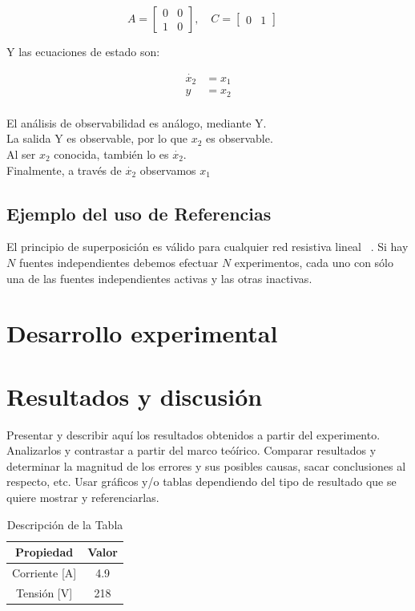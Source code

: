 \documentclass[letterpaper, 10 pt, conference]{ieeeconf}  %
\begin{document}
\[ 
A = \begin{bmatrix}
0 & 0\\
1 & 0
\end{bmatrix}, \quad
C = \begin{bmatrix}
0 & 1
\end{bmatrix} \quad 
\] 

Y las ecuaciones de estado son:

\[
\begin{aligned}
\dot{x_2} &=  x_1 \\
y&= x_2 \\
\end{aligned}
\]

El análisis de observabilidad es análogo, mediante Y. \\
La salida Y es observable, por lo que $x_2$ es observable. \\
Al ser $x_2$ conocida, también lo es $\dot{x_2}$. \\
Finalmente, a través de $\dot{x_2}$  observamos $x_1$ \\
\subsection{Ejemplo del uso de Referencias}

El principio de superposici\'on es v\'alido para cualquier red resistiva lineal ~\cite{c7}. Si hay $N$ fuentes independientes debemos efectuar $N$ experimentos, cada uno con s\'olo una de las fuentes independientes activas y las otras inactivas.

\section{Desarrollo experimental}



\section{Resultados y discusi\'on}

Presentar y describir aqu\'i los resultados obtenidos a partir del experimento. Analizarlos y contrastar a partir del marco te\'oírico. Comparar resultados y determinar la magnitud de los errores y sus posibles causas, sacar conclusiones al respecto, etc. Usar gráficos y/o tablas dependiendo del tipo de resultado que se quiere mostrar y referenciarlas.

\begin{table}[h]
\begin{center}
\begin{tabular}{|c||c|}
\hline
Propiedad & Valor\\
\hline
Corriente [A]& 4.9\\
\hline
Tensi\'on [V]& 218\\
\hline
\end{tabular}
\end{center}
\caption{Descripci\'on de la Tabla}
\label{tab:simple}
\end{table}
\end{document}
